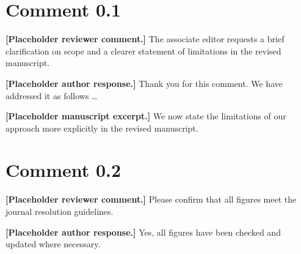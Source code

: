 \section{Comment 0.1}
\begin{reviewercomment}
\textbf{[Placeholder reviewer comment.]} The associate editor requests a brief clarification on scope and a clearer statement of limitations in the revised manuscript.
\end{reviewercomment}

\begin{refsegment}
\begin{authorresponse}
\textbf{[Placeholder author response.]} Thank you for this comment. We have addressed it as follows \ldots
\end{authorresponse}

\begin{authorchange}

\textbf{[Placeholder manuscript excerpt.]} We now state the limitations of our approach more explicitly in the revised manuscript.
\end{authorchange}
\RRSectionBibliography
\end{refsegment}

\section{Comment 0.2}
\begin{reviewercomment}
\textbf{[Placeholder reviewer comment.]} Please confirm that all figures meet the journal resolution guidelines.
\end{reviewercomment}

\begin{refsegment}
\begin{authorresponse}
\textbf{[Placeholder author response.]} Yes, all figures have been checked and updated where necessary.
\end{authorresponse}

\begin{authorchange}
\ReferToManuscript
\end{authorchange}
\RRSectionBibliography
\end{refsegment}
